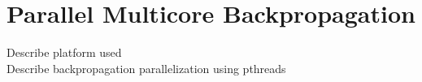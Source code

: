 \section{Parallel Multicore Backpropagation}
\label{ParBackProp}

Describe platform used \\
Describe backpropagation parallelization using pthreads
